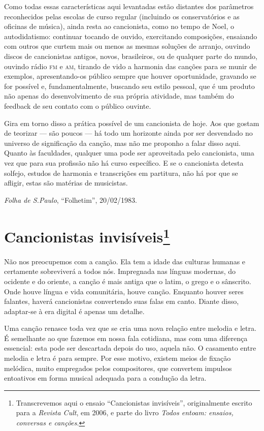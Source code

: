 Como todas essas características aqui levantadas estão distantes dos
parâmetros reconhecidos pelas escolas de curso regular (incluindo os
conservatórios e as oficinas de música), ainda resta ao cancionista,
como no tempo de Noel, o autodidatismo: continuar tocando de ouvido,
exercitando composições, ensaiando com outros que curtem mais ou menos
as mesmas soluções de arranjo, ouvindo discos de cancionistas antigos,
novos, brasileiros, ou de qualquer parte do mundo, ouvindo rádio \textsc{fm} e
\textsc{am}, tirando de vido a harmonia das canções para se munir de exemplos,
apresentando-os público sempre que houver oportunidade, gravando se for
possível e, fundamentalmente, buscando seu estilo pessoal, que é um
produto não apenas do desenvolvimento de sua própria atividade, mas
também do feedback de seu contato com o público ouvinte.

Gira em torno disso a prática possível de um cancionista de hoje. Aos
que gostam de teorizar --- são poucos --- há todo um horizonte ainda por ser
desvendado no universo de significação da canção, mas não me proponho a
falar disso aqui. Quanto às faculdades, qualquer uma pode ser
aproveitada pelo cancionista, uma vez que para sua profissão não há
curso específico. E se o cancionista detesta solfejo, estudos de
harmonia e transcrições em partitura, não há por que se afligir, estas
são matérias de musicistas.

\textit{Folha de S.Paulo}, ``Folhetim'', 20/02/1983.


\chapter{Cancionistas invisíveis\footnote{Transcrevemos aqui o ensaio ``Cancionistas invisíveis'', 
originalmente escrito para a \textit{Revista Cult}, em 2006, e parte do livro \textit{Todos entoam: ensaios, 
conversas e canções}.}}


Não nos preocupemos com a canção. Ela tem a idade das culturas humanas e
certamente sobreviverá a todos nós. Impregnada nas línguas modernas, do
ocidente e do oriente, a canção é mais antiga que o latim, o grego e o
sânscrito. Onde houve língua e vida comunitária, houve canção. Enquanto
houver seres falantes, haverá cancionistas convertendo suas falas em
canto. Diante disso, adaptar-se à era digital é apenas um detalhe.

Uma canção renasce toda vez que se cria uma nova relação entre melodia e
letra. É semelhante ao que fazemos em nossa fala cotidiana, mas com uma
diferença essencial: esta pode ser descartada depois do uso, aquela não.
O casamento entre melodia e letra é para sempre. Por esse motivo,
existem meios de fixação melódica, muito empregados pelos compositores,
que convertem impulsos entoativos em forma musical adequada para a
condução da letra.

